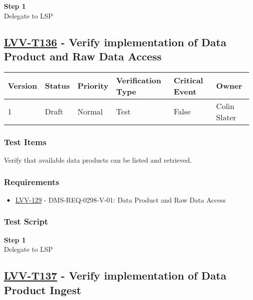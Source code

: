 \textbf{Step 1}\\
Delegate to LSP\\[2\baselineskip]

\hypertarget{lvv-t136---verify-implementation-of-data-product-and-raw-data-access}{\subsection{\texorpdfstring{\href{https://jira.lsstcorp.org/secure/Tests.jspa\#/testCase/LVV-T136}{LVV-T136}
- Verify implementation of Data Product and Raw Data
Access}{LVV-T136 - Verify implementation of Data Product and Raw Data Access}}\label{lvv-t136---verify-implementation-of-data-product-and-raw-data-access}}

\begin{longtable}[]{@{}llllll@{}}
\toprule
Version & Status & Priority & Verification Type & Critical Event &
Owner\tabularnewline
\midrule
\endhead
1 & Draft & Normal & Test & False & Colin Slater\tabularnewline
\bottomrule
\end{longtable}

\subsubsection{Test Items}\label{test-items-13}

Verify that available data products can be listed and retrieved.

\subsubsection{Requirements}\label{requirements-13}

\begin{itemize}
\tightlist
\item
  \href{https://jira.lsstcorp.org/browse/LVV-129}{LVV-129} -
  DMS-REQ-0298-V-01: Data Product and Raw Data Access
\end{itemize}

\subsubsection{Test Script}\label{test-script-13}

\textbf{Step 1}\\
Delegate to LSP\\[2\baselineskip]

\hypertarget{lvv-t137---verify-implementation-of-data-product-ingest}{\subsection{\texorpdfstring{\href{https://jira.lsstcorp.org/secure/Tests.jspa\#/testCase/LVV-T137}{LVV-T137}
- Verify implementation of Data Product
Ingest}{LVV-T137 - Verify implementation of Data Product Ingest}}\label{lvv-t137---verify-implementation-of-data-product-ingest}}

